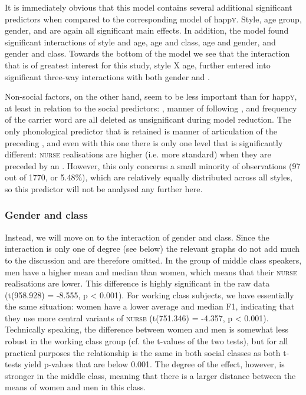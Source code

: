 It is immediately obvious that this model contains several additional significant predictors when compared to the corresponding model of happ\textsc{y}.
Style, age group, gender, and  are again all significant main effects.
In addition, the model found significant interactions of style and age, age and class, age and gender, and gender and class.
Towards the bottom of the model we see that the interaction that is of greatest interest for this study, style X age, further entered into significant three-way interactions with both gender and .

Non-social factors, on the other hand, seem to be less important than for happ\textsc{y}, at least in relation to the social predictors: , manner of following , and frequency of the carrier word are all deleted as unsignificant during model reduction.
The only phonological predictor that is retained is manner of articulation of the preceding , and even with this one there is only one level that is significantly different: \textsc{nurse} realisations are higher (i.e. more standard) when they are preceded by an .
However, this only concerns a small minority of observations (97 out of 1770, or 5.48\%), which are relatively equally distributed across all styles, so this predictor will not be analysed any further here.

\subsubsection{Gender and class}
\label{sec.prod.res.vow.nurse.f1.genderclass}

Instead, we will move on to the interaction of gender and class.
Since the interaction is only one of degree (see below) the relevant graphs do not add much to the discussion and are therefore omitted.
In the group of middle class speakers, men have a higher mean and median than women, which means that their \textsc{nurse} realisations are lower.
This difference is highly significant in the raw data (t(958.928) = -8.555, p < 0.001).
For working class subjects, we have essentially the same situation: women have a lower average and median F1, indicating that they use more central variants of \textsc{nurse} (t(751.346) = -4.357, p < 0.001).
Technically speaking, the difference between women and men is somewhat less robust in the working class group (cf. the t-values of the two tests), but for all practical purposes the relationship is the same in both social classes as both t-tests yield p-values that are below 0.001.
The degree of the effect, however, is stronger in the middle class, meaning that there is a larger distance between the means of women and men in this class.

